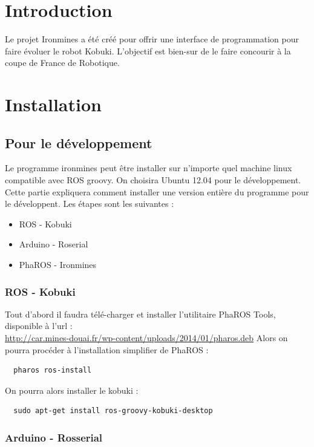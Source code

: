 \documentclass[a4paper, 11pt]{article}
\begin{document}
\section{Introduction}

Le projet Ironmines a été créé pour offrir une interface de
programmation pour faire évoluer le robot Kobuki. L'objectif est
bien-sur de le faire concourir à la coupe de France de Robotique.

\section{Installation}
\subsection{Pour le développement}
Le programme ironmines peut être installer sur n'importe quel machine
linux compatible avec ROS groovy. On choisira Ubuntu 12.04 pour le
développement. Cette partie expliquera comment installer une version
entière du programme pour le développent. Les étapes sont les
suivantes :
\begin{itemize}
\item ROS - Kobuki
\item Arduino - Roserial
\item PhaROS - Ironmines
\end{itemize}

\subsubsection{ROS - Kobuki}

Tout d'abord il faudra télé-charger et installer l'utilitaire PhaROS
Tools, disponible à l'url :\\
\url{http://car.mines-douai.fr/wp-content/uploads/2014/01/pharos.deb}
Alors on pourra procéder à l'installation simplifier de PhaROS :

\begin{verbatim}
  pharos ros-install
\end{verbatim}
On pourra alors installer le kobuki :
\begin{verbatim}
  sudo apt-get install ros-groovy-kobuki-desktop
\end{verbatim}

\subsubsection{Arduino - Rosserial}
\end{document}

